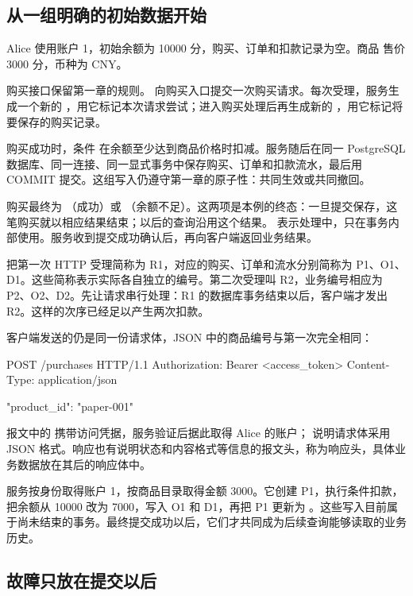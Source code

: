 \subsection*{从一组明确的初始数据开始}

Alice 使用账户 1，初始余额为 10000 分，购买、订单和扣款记录为空。商品  售价 3000 分，币种为 CNY。

购买接口保留第一章的规则。 向购买入口提交一次购买请求。每次受理，服务生成一个新的 ，用它标记本次请求尝试；进入购买处理后再生成新的 ，用它标记将要保存的购买记录。

购买成功时，条件  在余额至少达到商品价格时扣减。服务随后在同一 PostgreSQL 数据库、同一连接、同一显式事务中保存购买、订单和扣款流水，最后用 COMMIT 提交。这组写入仍遵守第一章的原子性：共同生效或共同撤回。

购买最终为 （成功）或 （余额不足）。这两项是本例的终态：一旦提交保存，这笔购买就以相应结果结束；以后的查询沿用这个结果。 表示处理中，只在事务内部使用。服务收到提交成功确认后，再向客户端返回业务结果。

把第一次 HTTP 受理简称为 R1，对应的购买、订单和流水分别简称为 P1、O1、D1。这些简称表示实际各自独立的编号。第二次受理叫 R2，业务编号相应为 P2、O2、D2。先让请求串行处理：R1 的数据库事务结束以后，客户端才发出 R2。这样的次序已经足以产生两次扣款。

客户端发送的仍是同一份请求体，JSON 中的商品编号与第一次完全相同：

\begin{BookCode}
POST /purchases HTTP/1.1
Authorization: Bearer <access_token>
Content-Type: application/json

{"product_id": "paper-001"}
\end{BookCode}

报文中的  携带访问凭据，服务验证后据此取得 Alice 的账户； 说明请求体采用 JSON 格式。响应也有说明状态和内容格式等信息的报文头，称为响应头，具体业务数据放在其后的响应体中。

服务按身份取得账户 1，按商品目录取得金额 3000。它创建 P1，执行条件扣款，把余额从 10000 改为 7000，写入 O1 和 D1，再把 P1 更新为 。这些写入目前属于尚未结束的事务。最终提交成功以后，它们才共同成为后续查询能够读取的业务历史。

\subsection*{故障只放在提交以后}

